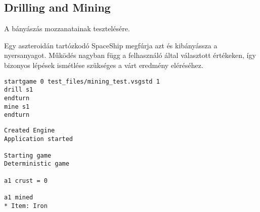 \documentclass[../../projlab]{subfiles}
\begin{document}
\subsection{Drilling and Mining}
\begin{test-case-description}
    A bányászás mozzanatainak tesztelésére.
\end{test-case-description}
\begin{test-case-function}
    Egy aszteroidán tartózkodó SpaceShip megfúrja azt és kibányássza a nyersanyagot. \newline
    Működés nagyban függ a felhasználó által választott értékeken, így bizonyos lépések ismétlése szükséges a várt eredmény eléréséhez.
\end{test-case-function}
\begin{test-case-input}
\begin{verbatim}
startgame 0 test_files/mining_test.vsgstd 1
drill s1
endturn
mine s1
endturn
\end{verbatim}
\end{test-case-input}
\begin{test-case-output}

\begin{verbatim}
Created Engine
Application started

Starting game
Deterministic game

a1 crust = 0

a1 mined 
* Item: Iron
\end{verbatim}
\end{test-case-output}
\end{document}
